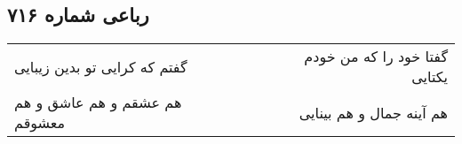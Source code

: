 \begin{center}
\section*{رباعی شماره ۷۱۶}
\label{sec:sh716}
\begin{longtable}{l p{0.5cm} r}
گفتم که کرایی تو بدین زیبایی
&&
گفتا خود را که من خودم یکتایی
\\
هم عشقم و هم عاشق و هم معشوقم
&&
هم آینه جمال و هم بینایی
\\
\end{longtable}
\end{center}
